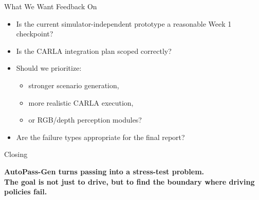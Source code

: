 \documentclass[aspectratio=169,11pt]{beamer}
\begin{document}
\begin{frame}{What We Want Feedback On}
\begin{itemize}
\item Is the current simulator-independent prototype a reasonable Week 1 checkpoint?
\item Is the CARLA integration plan scoped correctly?
\item Should we prioritize:
\begin{itemize}
\item stronger scenario generation,
\item more realistic CARLA execution,
\item or RGB/depth perception modules?
\end{itemize}
\item Are the failure types appropriate for the final report?
\end{itemize}
\end{frame}

\begin{frame}{Closing}
\begin{center}
\Large
\textbf{AutoPass-Gen turns passing into a stress-test problem.}\\[10pt]
\textbf{The goal is not just to drive, but to find the boundary where driving policies fail.}
\end{center}
\end{frame}
\end{document}
